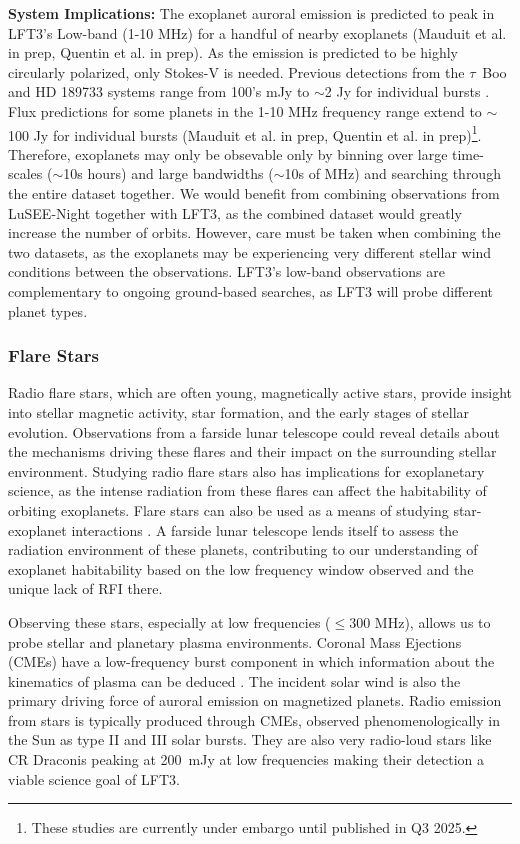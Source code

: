 \textbf{System Implications:} The exoplanet auroral emission is predicted to peak in LFT3's Low-band (1-10 MHz) for a handful of nearby exoplanets (Mauduit et al. in prep, Quentin et al. in prep). As the emission is predicted to be highly circularly polarized, only Stokes-V is needed. Previous detections from the $\tau$~Boo and HD 189733 systems range from 100's mJy to $\sim$2 Jy for individual bursts \citep{Turner2023_PRE,Zhang2025}. Flux predictions for some planets in the 1-10 MHz frequency range extend to $\sim$100 Jy for individual bursts (Mauduit et al. in prep, Quentin et al. in prep)\footnote{These studies are currently under embargo until published in Q3 2025.}. Therefore, exoplanets may only be obsevable only by binning over large time-scales ($\sim$10s hours) and large bandwidths ($\sim$10s of MHz) and searching through the entire dataset together. We would benefit from combining observations from LuSEE-Night together with LFT3, as the combined dataset would greatly increase the number of orbits. However, care must be taken when combining the two datasets, as the exoplanets may be experiencing very different stellar wind conditions between the observations. LFT3's low-band observations are complementary to ongoing ground-based searches, as LFT3 will probe different planet types. 

\subsubsection{Flare Stars}
Radio flare stars, which are often young, magnetically active stars, provide insight into stellar magnetic activity, star formation, and the early stages of stellar evolution. Observations from a farside lunar telescope could reveal details about the mechanisms driving these flares and their impact on the surrounding stellar environment. Studying radio flare stars also has implications for exoplanetary science, as the intense radiation from these flares can affect the habitability of orbiting exoplanets. Flare stars can also be used as a means of studying star-exoplanet interactions \citep{joe_nature_review}. A farside lunar telescope lends itself to assess the radiation environment of these planets, contributing to our understanding of exoplanet habitability based on the low frequency window observed and the unique lack of RFI there.

Observing these stars, especially at low frequencies ($\leq 300$ MHz), allows us to probe stellar and planetary plasma environments. Coronal Mass Ejections (CMEs) have a low-frequency burst component in which information about the kinematics of plasma can be deduced \citep{villadsen_ultra-wideband_2019}. The incident solar wind is also the primary driving force of auroral emission on magnetized planets. Radio emission from stars is typically produced through CMEs, observed phenomenologically in the Sun as type II and III solar bursts. They are also very radio-loud stars like CR Draconis peaking at 200~mJy at low frequencies \citep{callingham_low-frequency_2021} making their detection a viable science goal of LFT3. 

